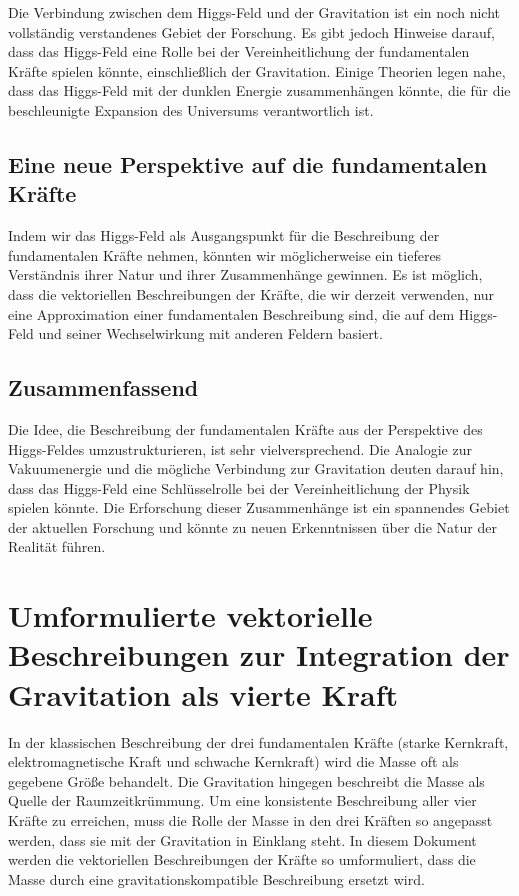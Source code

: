 \documentclass{article}
\begin{document}
Die Verbindung zwischen dem Higgs-Feld und der Gravitation ist ein noch nicht vollständig verstandenes Gebiet der Forschung. Es gibt jedoch Hinweise darauf, dass das Higgs-Feld eine Rolle bei der Vereinheitlichung der fundamentalen Kräfte spielen könnte, einschließlich der Gravitation. Einige Theorien legen nahe, dass das Higgs-Feld mit der dunklen Energie zusammenhängen könnte, die für die beschleunigte Expansion des Universums verantwortlich ist.

\subsection{Eine neue Perspektive auf die fundamentalen Kräfte}

Indem wir das Higgs-Feld als Ausgangspunkt für die Beschreibung der fundamentalen Kräfte nehmen, könnten wir möglicherweise ein tieferes Verständnis ihrer Natur und ihrer Zusammenhänge gewinnen. Es ist möglich, dass die vektoriellen Beschreibungen der Kräfte, die wir derzeit verwenden, nur eine Approximation einer fundamentalen Beschreibung sind, die auf dem Higgs-Feld und seiner Wechselwirkung mit anderen Feldern basiert.

\subsection{Zusammenfassend}

Die Idee, die Beschreibung der fundamentalen Kräfte aus der Perspektive des Higgs-Feldes umzustrukturieren, ist sehr vielversprechend. Die Analogie zur Vakuumenergie und die mögliche Verbindung zur Gravitation deuten darauf hin, dass das Higgs-Feld eine Schlüsselrolle bei der Vereinheitlichung der Physik spielen könnte. Die Erforschung dieser Zusammenhänge ist ein spannendes Gebiet der aktuellen Forschung und könnte zu neuen Erkenntnissen über die Natur der Realität führen.

	
	\section{Umformulierte vektorielle Beschreibungen zur Integration der Gravitation als vierte Kraft}
	
	In der klassischen Beschreibung der drei fundamentalen Kräfte (starke Kernkraft, elektromagnetische Kraft und schwache Kernkraft) wird die Masse oft als gegebene Größe behandelt. Die Gravitation hingegen beschreibt die Masse als Quelle der Raumzeitkrümmung. Um eine konsistente Beschreibung aller vier Kräfte zu erreichen, muss die Rolle der Masse in den drei Kräften so angepasst werden, dass sie mit der Gravitation in Einklang steht. In diesem Dokument werden die vektoriellen Beschreibungen der Kräfte so umformuliert, dass die Masse durch eine gravitationskompatible Beschreibung ersetzt wird.
	
\end{document}
